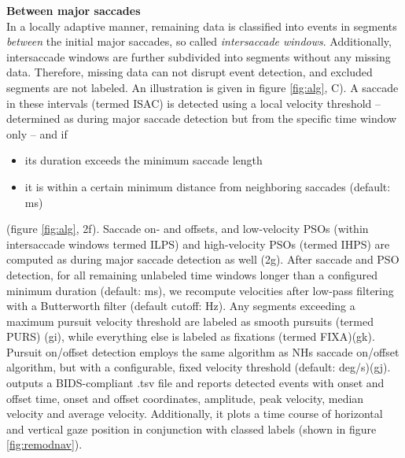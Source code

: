     \textbf{Between major saccades}\\
    In a locally adaptive manner, remaining data is classified into events in segments
    \textit{between} the initial major saccades, so called \textit{intersaccade windows}. Additionally, intersaccade
    windows are further subdivided into segments without any missing data. Therefore, missing data can not disrupt event
    detection, and excluded segments are not labeled. An illustration is given in figure \ref{fig:alg}, C). A saccade
    in these intervals (termed ISAC) is detected using a local velocity threshold -- determined as during major
    saccade detection but from the specific time window only -- and if
    \begin{itemize}
        \item its duration exceeds the minimum saccade length
        \item it is within a certain minimum distance from neighboring saccades (default: \unit[130]{ms})
    \end{itemize}
    (figure \ref{fig:alg}, 2f). Saccade on- and offsets, and low-velocity PSOs (within intersaccade
    windows termed ILPS) and high-velocity PSOs (termed IHPS) are computed as during major saccade detection as well
    (2g). After saccade and PSO detection, for all remaining unlabeled time windows longer than a configured minimum
    duration (default: \unit[40]{ms}), we recompute velocities after low-pass filtering with a Butterworth filter
    (default  cutoff: \unit[4]{Hz}). Any segments exceeding a maximum pursuit velocity threshold are labeled as
    smooth pursuits  (termed PURS) (gi), while everything else is labeled as fixations (termed FIXA)(gk). Pursuit
    on/offset detection  employs the same algorithm as NHs saccade on/offset algorithm, but with a configurable,
    fixed velocity threshold (default: \unit[2]{deg/s})(gj). \\
    \remodnav outputs a BIDS-compliant \citep{gorgolewski2016brain} .tsv file and
    reports detected events with onset and offset time, onset and offset coordinates, amplitude, peak velocity, median
    velocity and average velocity. Additionally, it plots a time course of horizontal and vertical gaze position in
    conjunction with classed labels (shown in figure \ref{fig:remodnav}).





